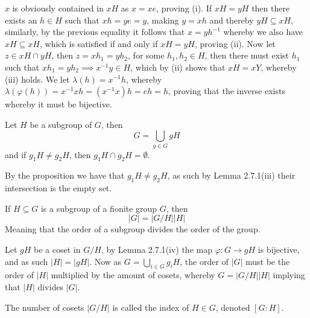 \begin{prf}
    $x$ is obviously contained in $xH$ as $x=xe$, proving (i). If $xH=yH$ then there exists an $h\in H$ such that $xh=ye=y$, making $y=xh$ and thereby $yH\subseteq xH$, similarly, by the previous equality it follows that $x=yh^{-1}$ whereby we also have $xH\subseteq xH$, which is satisfied if and only if $xH=yH$, proving (ii). Now let $z\in xH\cap yH$, then $z=xh_{1}=yh_{2}$, for some $h_{1},h_{2}\in H$, then there must exist $h_{1}$ such that $xh_{1}=yh_{2}\implies x^{-1}y\in H$, which by (ii) shows that $xH=xY$, whereby (iii) holds. We let $\lambda(h)=x^{-1}h$, whereby $\lambda(\varphi(h))=x^{-1}xh=(x^{-1}x)h=eh=h$, proving that the inverse exists whereby it must be bijective.
\end{prf}
\begin{coro}
    Let $H$ be a subgroup of $G$, then
    \[
        G=\bigcup_{g\in G}gH
    \]
    and if $g_{1}H\neq g_{2}H$, then $g_{1}H\cap g_{2}H=\emptyset$.
\end{coro}
\begin{prf}
    By the proposition we have that $g_{1}H\neq g_{2}H$, as such by Lemma 2.7.1(iii) their intersection is the empty set.
\end{prf}
\begin{theo}[Lagrange]
    If $H\subseteq G$ is a subgroup of a fionite group $G$, then
    \[
        |G|=|G/H||H|
    \]
    Meaning that the order of a subgroup divides the order of the group.
\end{theo}
\begin{prf}
    Let $gH$ be a coset in $G/H$, by Lemma 2.7.1(iv) the map $\varphi:G\rightarrow gH$ is bijective, and as such $|H|=|gH|$. Now as $G=\bigcup_{i\in G} g_{i}H$, the order of $|G|$ must be the order of $|H|$ multiplied by the amount of cosets, whereby $G=|G/H||H|$ implying that $|H|$ divides $|G|$.
\end{prf}
\begin{defi}[Index]
    The number of cosets $|G/H|$ is called the index of $H\in G$, denoted $[G:H]$.
\end{defi}
